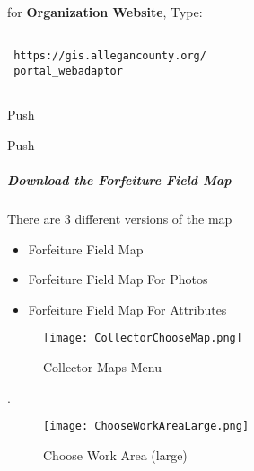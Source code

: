  \vspace{.25in}

 for \textbf{Organization Website}, Type:
 \vspace{.25in}

 \begin{verbatim}

 https://gis.allegancounty.org/
 portal_webadaptor


 \end{verbatim}

 \vspace{.5in}

 \noindent Push {\Large {} \lookArrow}
 \vspace{2.75in}

 \vspace{1in}

 \noindent Push {\Large {} \lookArrow}

 \clearpage
 \subparagraph[Download the Forfeiture Field Map]{Download the Forfeiture Field Map \texorpdfstring{\\}{}}
 \noindent There are 3 different versions of the map
 \vspace{.05in}

 \begin{itemize}
 \item Forfeiture Field Map
 \item Forfeiture Field Map For Photos
 \item Forfeiture Field Map For Attributes
 \end{itemize}

 \begin{wrapfigure}{r}{0.5\textwidth}
 \centering
     \texttt{[image: CollectorChooseMap.png]}
 \caption{Collector Maps Menu}
 \end{wrapfigure}
.
 \vspace{.5in}

 \vspace{1.75in}


 \clearpage
 \begin{wrapfigure}{r}{0.5\textwidth}
 \centering
     \texttt{[image: ChooseWorkAreaLarge.png]}
 \caption{Choose Work Area (large)}
 \end{wrapfigure}

